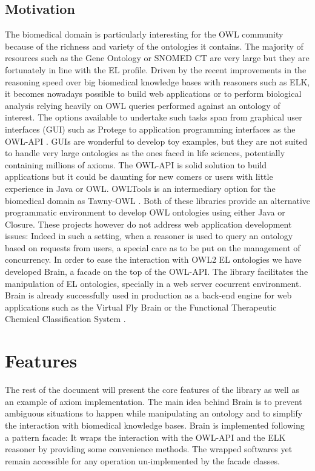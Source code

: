 \documentclass{llncs}
\begin{document}
\subsection{Motivation}
The biomedical domain is particularly interesting for the OWL community because of the richness and variety of the ontologies it contains.
The majority of resources such as the Gene Ontology \cite{Ashburner2000} or SNOMED CT \cite{snomed} are very large but they are fortunately in line with 
the EL profile.
Driven by the recent improvements in the reasoning speed over big biomedical knowledge bases with reasoners such as ELK,
it becomes nowadays possible to build web applications or to perform biological analysis relying heavily on OWL queries performed against
an ontology of interest. 
The options available to undertake such tasks span from graphical user interfaces (GUI) such as Protege \cite{protege} to application 
programming interfaces as
the OWL-API \cite{MatthewHorridge2011}. GUIs are wonderful to develop toy examples, but they are not suited to handle very large 
ontologies as the ones faced in life sciences, potentially containing millions of axioms. The OWL-API is solid solution to build
applications but it could be daunting for new comers or users with little experience in Java or OWL.
OWLTools \cite{owltools} is an intermediary option for the
biomedical domain as 
Tawny-OWL \cite{tawny}. Both of these libraries provide an alternative programmatic environment to develop OWL ontologies 
using either Java or Closure. These projects however do
not address web application development issues: Indeed in such a setting, when a reasoner is used to query an ontology based on requests
from users, a special care as to be put on the management of concurrency.
In order to ease the interaction with OWL2 EL ontologies we have developed Brain, a facade on the top of the OWL-API. 
The library facilitates the manipulation of EL ontologies, specially in a web server cocurrent environment. 
Brain is already successfully used in production as a back-end engine for web applications 
such as the Virtual Fly Brain \cite{vfb} or the Functional Therapeutic Chemical Classification System \cite{ftc}.

\section{Features}
The rest of the document will present the core features of the library as well as an example of axiom implementation.
The main idea behind Brain is to prevent ambiguous situations to happen while manipulating an ontology and to simplify 
the interaction with biomedical knowledge bases. Brain is implemented following a pattern facade: 
It wraps the interaction with the OWL-API and the ELK reasoner \cite{YevgenyKazakov2011} by providing some convenience methods.
The wrapped softwares yet remain accessible for any operation un-implemented by the facade classes.
\end{document}
